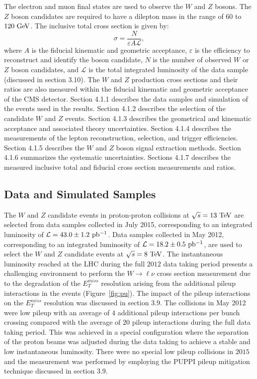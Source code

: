 The electron and muon final states are used to observe the $W$ and $Z$ bosons. The $Z$ boson candidates are required to have a dilepton mass in the range of $60$ to $120~\mathrm{Ge\kern -0.1em V}$. The inclusive total cross section is given by:  
\begin{equation} \label{eq:xsec2}
\sigma = \frac{N}{\varepsilon A \mathcal{L}},
\end{equation}
where $A$ is the fiducial kinematic and geometric acceptance, $\varepsilon$ is the efficiency to reconstruct and identify the boson candidate, $N$ is the number of observed $W$ or $Z$ boson candidates, and $\mathcal{L}$ is the total integrated luminosity of the data sample (discussed in section 3.10).  The $W$ and $Z$ production cross sections and their ratios are also measured within the fiducial kinematic and geometric acceptance of the CMS detector.  Section 4.1.1 describes the data samples and simulation of the events used in the results. Section 4.1.2 describes the selection of the candidate $W$ and $Z$ events. Section 4.1.3 describes the geometrical and kinematic acceptance and associated theory uncertainties. Section 4.1.4 describes the measurements of the lepton reconstruction, selection, and trigger efficiencies. Section 4.1.5 describes the $W$ and $Z$ boson signal extraction methods. Section 4.1.6 summarizes the systematic uncertainties. Sections 4.1.7 describes the measured inclusive total and fiducial cross section measurements and ratios.  

\subsection{Data and Simulated Samples}

The $W$ and $Z$ candidate events in proton-proton collisions at $\sqrt{s}=13~\mathrm{Te\kern -0.1em V}$ are selected from data samples collected in July 2015, corresponding to an integrated luminosity of $\mathcal{L}=43.0\pm1.2~\mathrm{pb^{-1}}$. Data samples collected in May 2012, corresponding to an integrated luminosity of $\mathcal{L}=18.2\pm0.5~\mathrm{pb^{-1}}$, are used to select the $W$ and $Z$ candidate events at $\sqrt{s}=8~\mathrm{Te\kern -0.1em V}$. The instantaneous luminosity reached at the LHC during the full $2012$ data taking period presents a challenging environment to perform the $W \rightarrow \ell \nu$ cross section measurement due to the degradation of the $E_{T}^{miss}$ resolution arising from the additional pileup interactions in the events (Figure~\ref{fig:pu}). The impact of the pileup interactions on the $E_{T}^{miss}$ resolution was discussed in section 3.9. The collisions in May 2012 were low pileup with an average of $4$ additional pileup interactions per bunch crossing compared with the average of $20$ pileup interactions during the full data taking period. This was achieved in a special configuration where the separation of the proton beams was adjusted during the data taking to achieve a stable and low instantaneous luminosity. There were no special low pileup collisions in $2015$ and the measurement was performed by employing the PUPPI pileup mitigation technique discussed in section 3.9.


